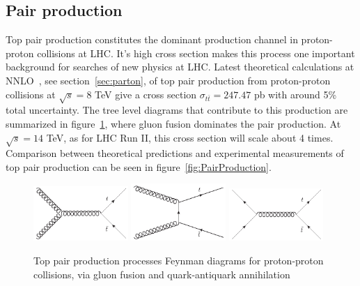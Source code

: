 \subsection{Pair production}
\label{subsec:toppair}

Top pair production constitutes the dominant production channel in proton-proton collisions at LHC. It's high cross section makes this process one important background for searches of new physics at LHC. Latest theoretical calculations at NNLO~\cite{Czakon:2013goa}, see section~\ref{sec:parton}, of top pair production from proton-proton collisions at $\sqrt{s}=8$ TeV give a cross section $\sigma_{t\bar{t}}=247.47$ pb with around 5\% total uncertainty. The tree level diagrams that contribute to this production are summarized in figure~\ref{fig:PairProductionFD}, where gluon fusion dominates the pair production. At $\sqrt{s}=14$ TeV, as for LHC Run II, this cross section will scale about 4 times. Comparison between theoretical predictions and experimental measurements of top pair production can be seen in figure~\ref{fig:PairProduction}.

\begin{figure}[!Hhtbp]
  \begin{center}
    \includegraphics[width=0.32\textwidth]{figs/Gluon_fusion_top_pair.jpg}
    \includegraphics[width=0.32\textwidth]{figs/Gluon_tchannel_top_pair.jpg}
    \includegraphics[width=0.32\textwidth]{figs/Quarks_schannel_top_pair.jpg}
    \caption{Top pair production processes Feynman diagrams for proton-proton collisions, via gluon fusion and quark-antiquark annihilation}
    \label{fig:PairProductionFD}
  \end{center}
\end{figure}

